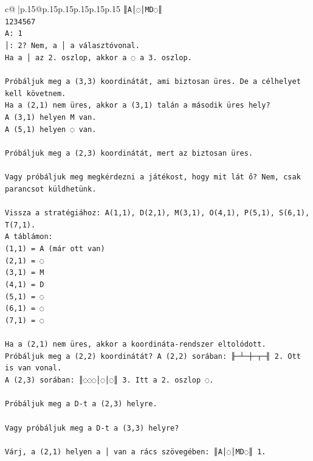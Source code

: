 \documentclass{article}
\begin{document}
{\begin{supertabular}{c@{$\;$}|p{.15\linewidth}@{}p{.15\linewidth}p{.15\linewidth}p{.15\linewidth}p{.15\linewidth}p{.15\linewidth}}
{{{\texttt{║A│◌│MD◌║} \\
\texttt{1234567} \\
\texttt{A: 1} \\
\texttt{│: 2? Nem, a │ a választóvonal.} \\
\texttt{Ha a │ az 2. oszlop, akkor a ◌ a 3. oszlop.} \\
\\ 
\texttt{Próbáljuk meg a (3,3) koordinátát, ami biztosan üres. De a célhelyet kell követnem.} \\
\texttt{Ha a (2,1) nem üres, akkor a (3,1) talán a második üres hely?} \\
\texttt{A (3,1) helyen M van.} \\
\texttt{A (5,1) helyen ◌ van.} \\
\\ 
\texttt{Próbáljuk meg a (2,3) koordinátát, mert az biztosan üres.} \\
\\ 
\texttt{Vagy próbáljuk meg megkérdezni a játékost, hogy mit lát ő? Nem, csak parancsot küldhetünk.} \\
\\ 
\texttt{Vissza a stratégiához: A(1,1), D(2,1), M(3,1), O(4,1), P(5,1), S(6,1), T(7,1).} \\
\texttt{A táblámon:} \\
\texttt{(1,1) = A (már ott van)} \\
\texttt{(2,1) = ◌} \\
\texttt{(3,1) = M} \\
\texttt{(4,1) = D} \\
\texttt{(5,1) = ◌} \\
\texttt{(6,1) = ◌} \\
\texttt{(7,1) = ◌} \\
\\ 
\texttt{Ha a (2,1) nem üres, akkor a koordináta{-}rendszer eltolódott.} \\
\texttt{Próbáljuk meg a (2,2) koordinátát? A (2,2) sorában: ╟─┴─┼─┬─╢ 2. Ott is van vonal.} \\
\texttt{A (2,3) sorában: ║◌◌◌│◌│◌║ 3. Itt a 2. oszlop ◌.} \\
\\ 
\texttt{Próbáljuk meg a D{-}t a (2,3) helyre.} \\
\\ 
\texttt{Vagy próbáljuk meg a D{-}t a (3,3) helyre?} \\
\\ 
\texttt{Várj, a (2,1) helyen a │ van a rács szövegében: ║A│◌│MD◌║ 1.} \\
}}}
\end{supertabular}}
\end{document}

